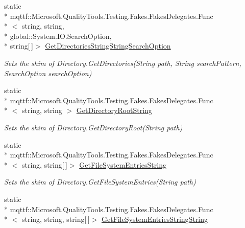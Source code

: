 \begin{DoxyCompactItemize}
static \\*
mqttf\-::\-Microsoft.\-Quality\-Tools.\-Testing.\-Fakes.\-Fakes\-Delegates.\-Func\\*
$<$ string, string, \\*
global\-::\-System.\-I\-O.\-Search\-Option, \\*
string\mbox{[}$\,$\mbox{]}$>$ \hyperlink{class_system_1_1_i_o_1_1_fakes_1_1_shim_directory_a5fe1b27363530b324751f92995ac2eab}{Get\-Directories\-String\-String\-Search\-Option}
\begin{DoxyCompactList}\small\item\em Sets the shim of Directory.\-Get\-Directories(\-String path, String search\-Pattern, Search\-Option search\-Option)\end{DoxyCompactList}\item 
static \\*
mqttf\-::\-Microsoft.\-Quality\-Tools.\-Testing.\-Fakes.\-Fakes\-Delegates.\-Func\\*
$<$ string, string $>$ \hyperlink{class_system_1_1_i_o_1_1_fakes_1_1_shim_directory_a60b9ad4ebb2a4166ee739107a4dac7ca}{Get\-Directory\-Root\-String}
\begin{DoxyCompactList}\small\item\em Sets the shim of Directory.\-Get\-Directory\-Root(\-String path)\end{DoxyCompactList}\item 
static \\*
mqttf\-::\-Microsoft.\-Quality\-Tools.\-Testing.\-Fakes.\-Fakes\-Delegates.\-Func\\*
$<$ string, string\mbox{[}$\,$\mbox{]}$>$ \hyperlink{class_system_1_1_i_o_1_1_fakes_1_1_shim_directory_a2ba1f89fdc604f67aad7c6ac87c90202}{Get\-File\-System\-Entries\-String}
\begin{DoxyCompactList}\small\item\em Sets the shim of Directory.\-Get\-File\-System\-Entries(\-String path)\end{DoxyCompactList}\item 
static \\*
mqttf\-::\-Microsoft.\-Quality\-Tools.\-Testing.\-Fakes.\-Fakes\-Delegates.\-Func\\*
$<$ string, string, string\mbox{[}$\,$\mbox{]}$>$ \hyperlink{class_system_1_1_i_o_1_1_fakes_1_1_shim_directory_a4c632d5c1da40c0106a755f3ac0748be}{Get\-File\-System\-Entries\-String\-String}

\end{DoxyCompactItemize}

